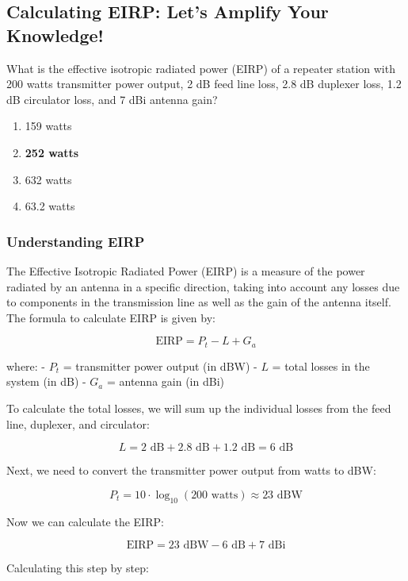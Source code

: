 \subsection{Calculating EIRP: Let's Amplify Your Knowledge!}

\begin{tcolorbox}[colback=gray!10, colframe=black, title=E9A07] What is the effective isotropic radiated power (EIRP) of a repeater station with 200 watts transmitter power output, 2 dB feed line loss, 2.8 dB duplexer loss, 1.2 dB circulator loss, and 7 dBi antenna gain?

\begin{enumerate}[label=\Alph*]
    \item 159 watts
    \item \textbf{252 watts}
    \item 632 watts
    \item 63.2 watts
\end{enumerate} \end{tcolorbox}

\subsubsection{Understanding EIRP}

The Effective Isotropic Radiated Power (EIRP) is a measure of the power radiated by an antenna in a specific direction, taking into account any losses due to components in the transmission line as well as the gain of the antenna itself. The formula to calculate EIRP is given by:

\[
\text{EIRP} = P_t - L + G_a
\]

where:
- \(P_t\) = transmitter power output (in dBW)
- \(L\) = total losses in the system (in dB)
- \(G_a\) = antenna gain (in dBi)

To calculate the total losses, we will sum up the individual losses from the feed line, duplexer, and circulator:

\[
L = 2 \text{ dB} + 2.8 \text{ dB} + 1.2 \text{ dB} = 6 \text{ dB}
\]

Next, we need to convert the transmitter power output from watts to dBW:

\[
P_t = 10 \cdot \log_{10}(200 \text{ watts}) \approx 23 \text{ dBW}
\]

Now we can calculate the EIRP:

\[
\text{EIRP} = 23 \text{ dBW} - 6 \text{ dB} + 7 \text{ dBi}
\]

Calculating this step by step:


